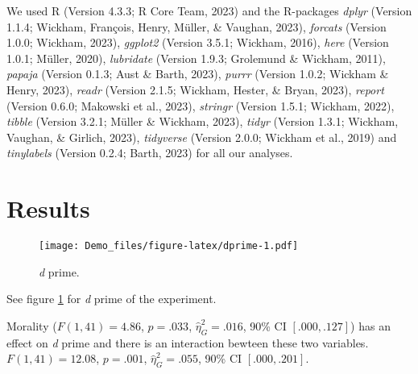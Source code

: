 \documentclass[
  man]{apa6}
\begin{document}
We used R (Version 4.3.3; R Core Team, 2023) and the R-packages \emph{dplyr} (Version 1.1.4; Wickham, François, Henry, Müller, \& Vaughan, 2023), \emph{forcats} (Version 1.0.0; Wickham, 2023), \emph{ggplot2} (Version 3.5.1; Wickham, 2016), \emph{here} (Version 1.0.1; Müller, 2020), \emph{lubridate} (Version 1.9.3; Grolemund \& Wickham, 2011), \emph{papaja} (Version 0.1.3; Aust \& Barth, 2023), \emph{purrr} (Version 1.0.2; Wickham \& Henry, 2023), \emph{readr} (Version 2.1.5; Wickham, Hester, \& Bryan, 2023), \emph{report} (Version 0.6.0; Makowski et al., 2023), \emph{stringr} (Version 1.5.1; Wickham, 2022), \emph{tibble} (Version 3.2.1; Müller \& Wickham, 2023), \emph{tidyr} (Version 1.3.1; Wickham, Vaughan, \& Girlich, 2023), \emph{tidyverse} (Version 2.0.0; Wickham et al., 2019) and \emph{tinylabels} (Version 0.2.4; Barth, 2023) for all our analyses.

\section{Results}\label{results}

\begin{figure}
\centering
\texttt{[image: Demo\_files/figure-latex/dprime-1.pdf]}
\caption{\label{fig:dprime}\emph{d} prime.}
\end{figure}

See figure \ref{fig:dprime} for \emph{d} prime of the experiment.

Morality (\(F(1, 41) = 4.86\), \(p = .033\), \(\hat{\eta}^2_G = .016\), 90\% CI \([.000, .127]\)) has an effect on \emph{d} prime and there is an interaction bewteen these two variables. \(F(1, 41) = 12.08\), \(p = .001\), \(\hat{\eta}^2_G = .055\), 90\% CI \([.000, .201]\).
\end{document}

